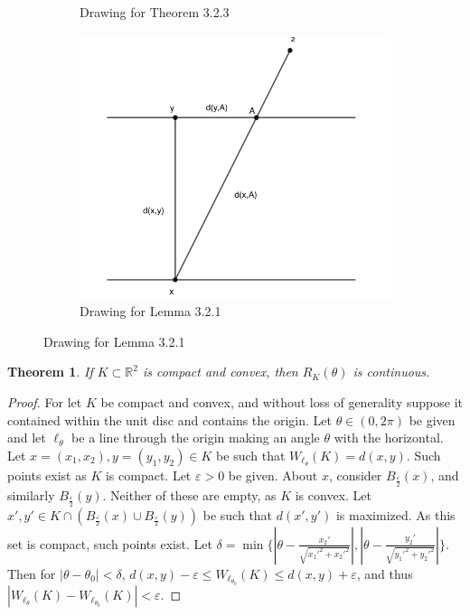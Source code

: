 \documentclass[oneside]{book}
\theoremstyle{mystyle}
\newtheorem{theorem}{Theorem}[section]
\begin{document}
\begin{figure}[H]
\begin{subfigure}[b]{0.32\textwidth}
    \caption{Drawing for Theorem 3.2.3}
  \end{subfigure}
  \begin{subfigure}[b]{0.32\textwidth}
    \centering
    \includegraphics[width=\textwidth]{line-1.png}
    \caption{Drawing for Lemma 3.2.1}
  \end{subfigure}  
\end{figure}

\begin{theorem}
If $K\subset \mathbb{R}^2$ is compact and convex, then $R_K(\theta)$ is continuous.
\end{theorem}
\begin{proof}
For let $K$ be compact and convex, and without loss of generality suppose it contained within the unit disc and contains the origin. Let $\theta\in (0,2\pi)$ be given and let $\ell_{\theta}$ be a line through the origin making an angle $\theta$ with the horizontal. Let $x=(x_1,x_2),y=(y_1,y_2)\in K$ be such that $W_{\ell_{\theta}}(K) = d(x,y)$. Such points exist as $K$ is compact. Let $\varepsilon>0$ be given. About $x$, consider $B_{\frac{\varepsilon}{2}}(x)$, and similarly $B_{\frac{\varepsilon}{2}}(y)$. Neither of these are empty, as $K$ is convex. Let $x',y'\in K\cap(B_{\frac{\varepsilon}{2}}(x)\cup B_{\frac{\varepsilon}{2}}(y))$ be such that $d(x',y')$ is maximized. As this set is compact, such points exist. Let $\delta = \min\{|\theta-\frac{x_2'}{\sqrt{x_1'^2+x_2'^2}}|,|\theta-\frac{y_2'}{\sqrt{y_1'^2+y_2'^2}}|\}$. Then for $|\theta-\theta_0|<\delta$, $d(x,y)-\varepsilon \leq W_{\ell_{\theta_0}}(K)\leq d(x,y)+\varepsilon$, and thus $|W_{\ell_\theta}(K)-W_{\ell_{\theta_0}}(K)| < \varepsilon$.
\end{proof}
\end{document}
